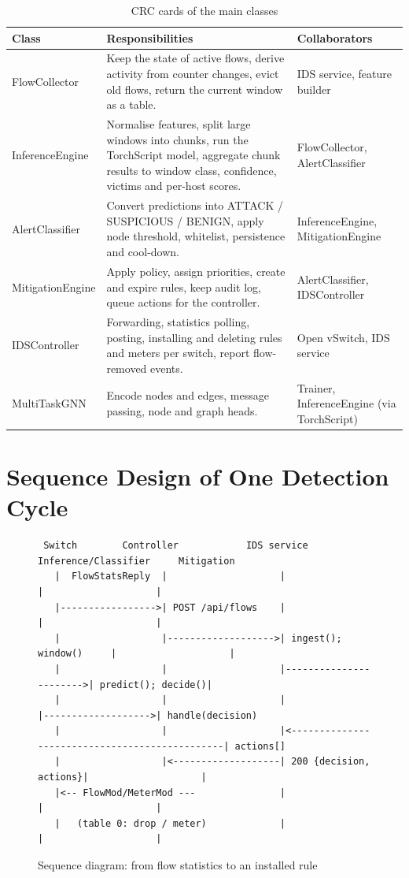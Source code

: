 \begin{table}[htbp]
\centering
\caption{CRC cards of the main classes}
\label{tab:crc}
\small
\begin{tabularx}{\textwidth}{|p{3cm}|X|X|}
\hline
\textbf{Class} & \textbf{Responsibilities} & \textbf{Collaborators} \\ \hline
FlowCollector & Keep the state of active flows, derive activity from counter changes, evict old flows, return the current window as a table. & IDS service, feature builder \\ \hline
InferenceEngine & Normalise features, split large windows into chunks, run the TorchScript model, aggregate chunk results to window class, confidence, victims and per-host scores. & FlowCollector, AlertClassifier \\ \hline
AlertClassifier & Convert predictions into ATTACK / SUSPICIOUS / BENIGN, apply node threshold, whitelist, persistence and cool-down. & InferenceEngine, MitigationEngine \\ \hline
MitigationEngine & Apply policy, assign priorities, create and expire rules, keep audit log, queue actions for the controller. & AlertClassifier, IDSController \\ \hline
IDSController & Forwarding, statistics polling, posting, installing and deleting rules and meters per switch, report flow-removed events. & Open vSwitch, IDS service \\ \hline
MultiTaskGNN & Encode nodes and edges, message passing, node and graph heads. & Trainer, InferenceEngine (via TorchScript) \\ \hline
\end{tabularx}
\end{table}

\section{Sequence Design of One Detection Cycle}

\begin{figure}[htbp]
\centering
\scriptsize
\begin{verbatim}
 Switch        Controller            IDS service           Inference/Classifier     Mitigation
   |  FlowStatsReply  |                    |                        |                    |
   |----------------->| POST /api/flows    |                        |                    |
   |                  |------------------->| ingest(); window()     |                    |
   |                  |                    |----------------------->| predict(); decide()|
   |                  |                    |                        |------------------->| handle(decision)
   |                  |                    |<-----------------------------------------------| actions[]
   |                  |<-------------------| 200 {decision, actions}|                    |
   |<-- FlowMod/MeterMod ---               |                        |                    |
   |   (table 0: drop / meter)             |                        |                    |
\end{verbatim}
\caption{Sequence diagram: from flow statistics to an installed rule}
\label{fig:sequence}
\end{figure}

